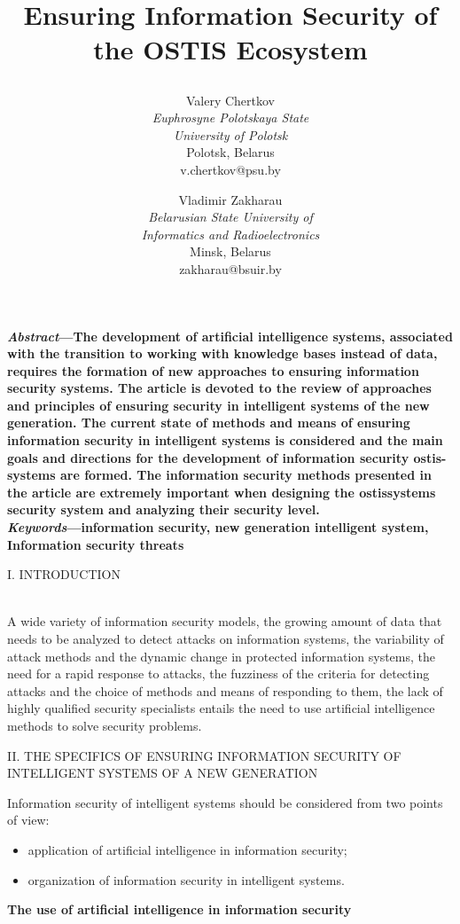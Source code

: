 \documentclass[10pt, a4paper]{proc}
\title{
 \begin{spacing}
  \textbf{\LARGE{Ensuring Information Security of the OSTIS
Ecosystem}}
 \end{spacing}
}
\author{
 Valery Chertkov\\\textit{Euphrosyne Polotskaya State}\\\textit{University of Polotsk}\\Polotsk, Belarus\\v.chertkov@psu.by\\
 \and
 Vladimir Zakharau\\\textit{Belarusian State University of}\\\textit{Informatics and Radioelectronics
}\\Minsk, Belarus\\zakharau@bsuir.by
}
\begin{document}
 \maketitle
 \textbf{
  \textit{Abstract}—The development of artificial intelligence systems, associated with the transition to working with
knowledge bases instead of data, requires the formation of
new approaches to ensuring information security systems.
The article is devoted to the review of approaches and
principles of ensuring security in intelligent systems of
the new generation. The current state of methods and
means of ensuring information security in intelligent systems
is considered and the main goals and directions for
the development of information security ostis-systems are
formed. The information security methods presented in the
article are extremely important when designing the ostissystems security system and analyzing their security level.
}\\

\textbf{ \textit{Keywords}—information security, new generation intelligent system, Information security threats
}
\begin{center}
 I. INTRODUCTION
 \end{center}\\

 A wide variety of information security models, the
growing amount of data that needs to be analyzed to
detect attacks on information systems, the variability of
attack methods and the dynamic change in protected
information systems, the need for a rapid response to
attacks, the fuzziness of the criteria for detecting attacks
and the choice of methods and means of responding to
them, the lack of highly qualified security specialists
entails the need to use artificial intelligence methods to
solve security problems.
\begin{center}
 II. THE SPECIFICS OF ENSURING INFORMATION
SECURITY OF INTELLIGENT SYSTEMS OF A NEW
GENERATION
 \end{center}
 
 Information security of intelligent systems should be
considered from two points of view:
\begin{itemize}[noitemsep]
    \item application of artificial intelligence in information
security;
    \item organization of information security in intelligent
systems.
\end{itemize}

\textbf{The use of artificial intelligence in information
security}
\end{document}
